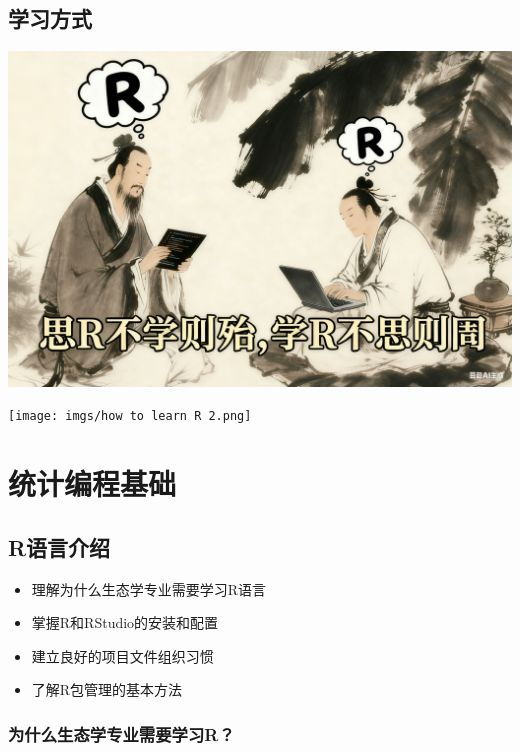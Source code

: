 \documentclass[
]{book}
\providecommand{\tightlist}{%
  \setlength{\itemsep}{0pt}\setlength{\parskip}{0pt}}
\begin{document}
\hypertarget{ux5b66ux4e60ux65b9ux5f0f}{%
\section{学习方式}\label{ux5b66ux4e60ux65b9ux5f0f}}

\includegraphics{imgs/how to learn R.png}

\texttt{[image: imgs/how to learn R 2.png]}

\hypertarget{ux7edfux8ba1ux7f16ux7a0bux57faux7840}{%
\chapter{统计编程基础}\label{ux7edfux8ba1ux7f16ux7a0bux57faux7840}}

\hypertarget{rux8bedux8a00ux4ecbux7ecd}{%
\section{R语言介绍}\label{rux8bedux8a00ux4ecbux7ecd}}

\begin{itemize}
\tightlist
\item
  理解为什么生态学专业需要学习R语言
\item
  掌握R和RStudio的安装和配置
\item
  建立良好的项目文件组织习惯
\item
  了解R包管理的基本方法
\end{itemize}

\hypertarget{ux4e3aux4ec0ux4e48ux751fux6001ux5b66ux4e13ux4e1aux9700ux8981ux5b66ux4e60r}{%
\subsection{为什么生态学专业需要学习R？}\label{ux4e3aux4ec0ux4e48ux751fux6001ux5b66ux4e13ux4e1aux9700ux8981ux5b66ux4e60r}}
\end{document}
